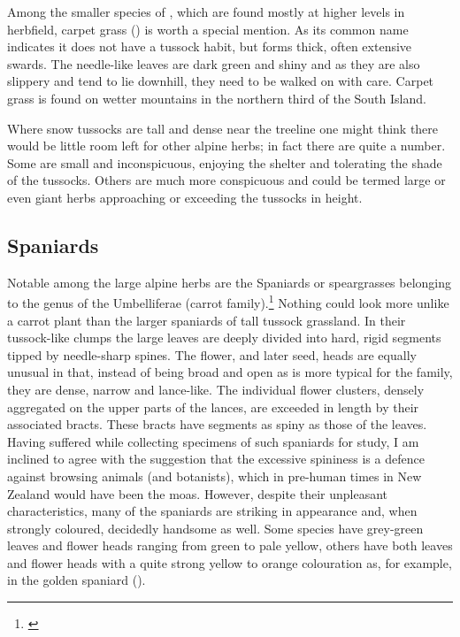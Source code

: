 Among the smaller species of , which are found mostly at higher levels in herbfield, carpet grass () is worth a special mention.
As its common name indicates it does not have a tussock habit, but forms thick, often extensive swards.
The needle-like leaves are dark green and shiny and as they are also slippery and tend to lie downhill, they need to be walked on with care.
Carpet grass is found on wetter mountains in the northern third of the South Island.

Where snow tussocks are tall and dense near the treeline one might think there would be little room left for other alpine herbs; in fact there are quite a number.
Some are small and inconspicuous, enjoying the shelter and tolerating the shade of the tussocks.
Others are much more conspicuous and could be termed large or even giant herbs approaching or exceeding the tussocks in height.

\subsection{Spaniards}

Notable among the large alpine herbs are the Spaniards or speargrasses belonging to the genus  of the Umbelliferae (carrot family).\footnote{\cite{dawson1978research}}
Nothing could look more unlike a carrot plant than the larger spaniards of tall tussock grassland.
In their tussock-like clumps the large leaves are deeply divided into hard, rigid segments tipped by needle-sharp spines.
The flower, and later seed, heads are equally unusual in that, instead of being broad and open as is more typical for the family, they are dense, narrow and lance-like.
The individual flower clusters, densely aggregated on the upper parts of the lances, are exceeded in length by their associated bracts.
These bracts have segments as spiny as those of the leaves.
Having suffered while collecting specimens of such spaniards for study, I am inclined to agree with the suggestion that the excessive spininess is a defence against browsing animals (and botanists), which in pre-human times in New Zealand would have been the moas.
However, despite their unpleasant characteristics, many of the spaniards are striking in appearance and, when strongly coloured, decidedly handsome as well.
Some species have grey-green leaves and flower heads ranging from green to pale yellow, others have both leaves and flower heads with a quite strong yellow to orange colouration as, for example, in the golden spaniard ().

